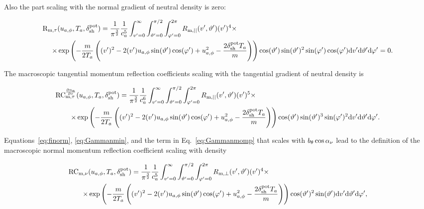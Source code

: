 \noindent Also the part scaling with the normal gradient of neutral density is zero:

\begin{align}
    \mathrm{R}_{\mathrm{m},\tau} & (u_{a,\phi},T_a,\delta_{\mathrm{sh}}^{\mathrm{pot}}) =
         \frac{1}{\pi^\frac{3}{2}} \frac{1}{c_a^5} \int_{v'=0}^{\infty} \int_{\vartheta'=0}^{\pi/2} \int_{\varphi'=0}^{2\pi}
    R_{\mathrm{m,||}}(v',\vartheta') (v')^4 \times \nonumber \\
    \times & \exp \left( - \frac{m}{2 T_a} \left( (v')^2-2 (v') u_{a,\phi} \sin (\vartheta') \cos (\varphi') + u_{a,\phi}^2 - \frac{2 \delta_{\mathrm{sh}}^{\mathrm{pot}} T_a}{m} \right) \right) \cos (\vartheta') \sin (\vartheta')^2 \sin (\varphi') \cos (\varphi')
    \mathrm{d} v' \mathrm{d} \vartheta' \mathrm{d} \varphi' = 0.
\end{align}

\noindent The macroscopic tangential momentum reflection coefficients scaling with the tangential gradient of neutral density is

\begin{align}
    \mathrm{RC}_{\mathrm{m},\tau}^{\frac{\partial n_\mathrm{n}}{\partial \tau}} & (u_{a,\phi},T_a,\delta_{\mathrm{sh}}^{\mathrm{pot}}) =
      \frac{1}{\pi^\frac{3}{2}} \frac{1}{c_a^6} \int_{v'=0}^{\infty} \int_{\vartheta'=0}^{\pi/2} \int_{\varphi'=0}^{2\pi}
    R_{\mathrm{m,||}}(v',\vartheta') (v')^5 \times \nonumber \\
    \times & \exp \left( - \frac{m}{2 T_a} \left( (v')^2-2 (v') u_{a,\phi} \sin (\vartheta') \cos (\varphi') + u_{a,\phi}^2 - \frac{2 \delta_{\mathrm{sh}}^{\mathrm{pot}} T_a}{m} \right) \right) \cos (\vartheta') \sin (\vartheta')^3 \sin (\varphi')^2
    \mathrm{d} v' \mathrm{d} \vartheta' \mathrm{d} \varphi'. \label{eq:rmytwo_def}
\end{align}

\noindent Equations~\eqref{eq:finorm}, \eqref{eq:Gammanmin}, and the term in Eq.~\eqref{eq:Gammanmomp} that scales with $b_{\theta} \cos \alpha_{\nu}$ lead to the definition of the macroscopic normal momentum reflection coefficient scaling with density

\begin{align}
    \mathrm{RC}_{\mathrm{m},\nu} & (u_{a,\phi},T_a,\delta_{\mathrm{sh}}^{\mathrm{pot}}) =
    \frac{1}{\pi^\frac{3}{2}} \frac{1}{c_a^5} \int_{v'=0}^{\infty} \int_{\vartheta'=0}^{\pi/2} \int_{\varphi'=0}^{2\pi}
    R_{\mathrm{m,\perp}}(v',\vartheta') (v')^4 \times \nonumber \\
    \times & \exp \left( - \frac{m}{2 T_a} \left( (v')^2-2 (v') u_{a,\phi} \sin (\vartheta') \cos (\varphi') + u_{a,\phi}^2 - \frac{2 \delta_{\mathrm{sh}}^{\mathrm{pot}} T_a}{m} \right) \right) \cos (\vartheta')^2 \sin (\vartheta')
    \mathrm{d} v' \mathrm{d} \vartheta' \mathrm{d} \varphi', \label{eq:rmzonei_def}
\end{align}

